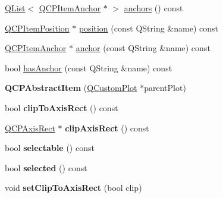 \begin{DoxyCompactItemize}
\item 
\hyperlink{class_q_list}{Q\+List}$<$ \hyperlink{class_q_c_p_item_anchor}{Q\+C\+P\+Item\+Anchor} $\ast$ $>$ \hyperlink{class_q_c_p_abstract_item_a81d1ecfea3368b836cf9675a0045e659}{anchors} () const
\item 
\hyperlink{class_q_c_p_item_position}{Q\+C\+P\+Item\+Position} $\ast$ \hyperlink{class_q_c_p_abstract_item_a2589c3d298f9a576d77d9addb440a18d}{position} (const Q\+String \&name) const
\item 
\hyperlink{class_q_c_p_item_anchor}{Q\+C\+P\+Item\+Anchor} $\ast$ \hyperlink{class_q_c_p_abstract_item_a139c255ea8831642fac91748e29a5adb}{anchor} (const Q\+String \&name) const
\item 
bool \hyperlink{class_q_c_p_abstract_item_a84914f4516f9b38ef0bd89eafe3dbda7}{has\+Anchor} (const Q\+String \&name) const
\item 
\mbox{\label{class_q_c_p_abstract_item_a9922507d8b4503a1fe1ed0b1030e23b6}} 
{\bfseries Q\+C\+P\+Abstract\+Item} (\hyperlink{class_q_custom_plot}{Q\+Custom\+Plot} $\ast$parent\+Plot)
\item 
\mbox{\label{class_q_c_p_abstract_item_a42715ad5f3d7fca6854025fa5636f436}} 
bool {\bfseries clip\+To\+Axis\+Rect} () const
\item 
\mbox{\label{class_q_c_p_abstract_item_a8114ec3765b24394c6a6dcc16e1ab59f}} 
\hyperlink{class_q_c_p_axis_rect}{Q\+C\+P\+Axis\+Rect} $\ast$ {\bfseries clip\+Axis\+Rect} () const
\item 
\mbox{\label{class_q_c_p_abstract_item_ae29aa489767352b40c4aaa7ea50c5582}} 
bool {\bfseries selectable} () const
\item 
\mbox{\label{class_q_c_p_abstract_item_aa069fba320a13639f119f82ad29ead96}} 
bool {\bfseries selected} () const
\item 
\mbox{\label{class_q_c_p_abstract_item_a39e05b9d4176b9accafc746d16ca6a06}} 
void {\bfseries set\+Clip\+To\+Axis\+Rect} (bool clip)
\item 
\mbox{\label{class_q_c_p_abstract_item_a7dc75fcbcd10206fe0b75d757ea7a347}} 

\end{DoxyCompactItemize}
